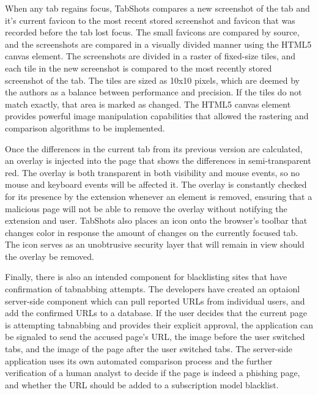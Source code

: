 \documentclass[12pt]{article}
\begin{document}
\begin{doublespace}
When any tab regains focus, TabShots compares a new screenshot of the tab and it's current favicon to the most recent stored screenshot and favicon that was recorded before the tab lost focus.  The small favicons are compared by source, and the screenshots are compared in a visually divided manner using the HTML5 canvas element.  The screenshots are divided in a raster of fixed-size tiles, and each tile in the new screenshot is compared to the most recently stored screenshot of the tab.  The tiles are sized as 10x10 pixels, which are deemed by the authors as a balance between performance and precision.  If the tiles do not match exactly, that area is marked as changed.  The HTML5 canvas element provides powerful image manipulation capabilities that allowed the rastering and comparison algorithms to be implemented.

Once the differences in the current tab from its previous version are calculated, an overlay is injected into the page that shows the differences in semi-transparent red.  The overlay is both transparent in both visibility and mouse events, so no mouse and keyboard events will be affected it.  The overlay is constantly checked for its presence by the extension whenever an element is removed, ensuring that a malicious page will not be able to remove the overlay without notifying the extension and user.  TabShots also places an icon onto the browser's toolbar that changes color in response the amount of changes on the currently focused tab.  The icon serves as an unobtrusive security layer that will remain in view should the overlay be removed.

Finally, there is also an intended component for blacklisting sites that have confirmation of tabnabbing attempts.  The developers have created an optaionl server-side component which can pull reported URLs from individual users, and add the confirmed URLs to a database.  If the user decides that the current page is attempting tabnabbing and provides their explicit approval, the application can be signaled to send the accused page's URL, the image before the user switched tabs, and the image of the page after the user switched tabs.  The server-side application uses its own automated comparison process and the further verification of a human analyst to decide if the page is indeed a phishing page, and whether the URL should be added to a subscription model blacklist.  


\end{doublespace}
\end{document}
